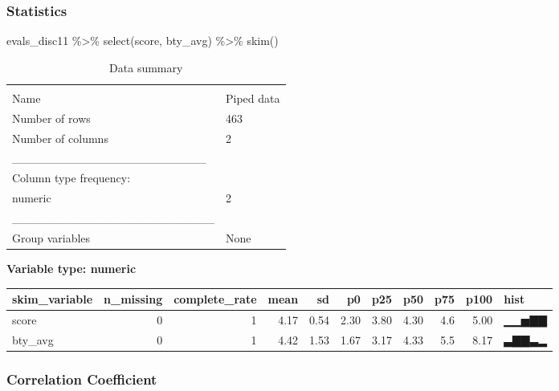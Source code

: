 \documentclass[
]{article}
\newenvironment{Shaded}{\begin{snugshade}}{\end{snugshade}}
\newcommand{\FunctionTok}[1]{\textcolor[rgb]{0.00,0.00,0.00}{#1}}
\newcommand{\NormalTok}[1]{#1}
\newcommand{\SpecialCharTok}[1]{\textcolor[rgb]{0.00,0.00,0.00}{#1}}
\begin{document}
\hypertarget{statistics}{%
\subsubsection{Statistics}\label{statistics}}

\begin{Shaded}
\begin{Highlighting}[]
\NormalTok{evals\_disc11 }\SpecialCharTok{\%\textgreater{}\%} 
  \FunctionTok{select}\NormalTok{(score, bty\_avg) }\SpecialCharTok{\%\textgreater{}\%} \FunctionTok{skim}\NormalTok{()}
\end{Highlighting}
\end{Shaded}

\begin{longtable}[]{@{}ll@{}}
\caption{Data summary}\tabularnewline
\toprule
& \\
\midrule
\endfirsthead
\toprule
& \\
\midrule
\endhead
Name & Piped data \\
Number of rows & 463 \\
Number of columns & 2 \\
\_\_\_\_\_\_\_\_\_\_\_\_\_\_\_\_\_\_\_\_\_\_\_ & \\
Column type frequency: & \\
numeric & 2 \\
\_\_\_\_\_\_\_\_\_\_\_\_\_\_\_\_\_\_\_\_\_\_\_\_ & \\
Group variables & None \\
\bottomrule
\end{longtable}

\textbf{Variable type: numeric}

\begin{longtable}[]{@{}lrrrrrrrrrl@{}}
\toprule
skim\_variable & n\_missing & complete\_rate & mean & sd & p0 & p25 &
p50 & p75 & p100 & hist \\
\midrule
\endhead
score & 0 & 1 & 4.17 & 0.54 & 2.30 & 3.80 & 4.30 & 4.6 & 5.00 & ▁▁▅▇▇ \\
bty\_avg & 0 & 1 & 4.42 & 1.53 & 1.67 & 3.17 & 4.33 & 5.5 & 8.17 &
▃▇▇▃▂ \\
\bottomrule
\end{longtable}

\hypertarget{correlation-coefficient}{%
\subsubsection{Correlation Coefficient}\label{correlation-coefficient}}
\end{document}
